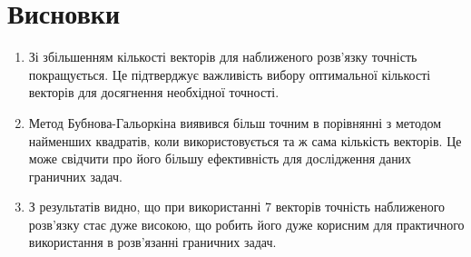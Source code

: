 \chapter{Висновки}

\begin{enumerate}
    \item     Зі збільшенням кількості векторів для наближеного розв'язку точність покращується. Це підтверджує важливість вибору оптимальної кількості векторів для досягнення необхідної точності.

   \item Метод Бубнова-Гальоркіна виявився більш точним в порівнянні з методом найменших квадратів, коли використовується та ж сама кількість векторів. Це може свідчити про його більшу ефективність для дослідження даних граничних задач.

    \item З результатів видно, що при використанні 7 векторів точність наближеного розв'язку стає дуже високою, що робить його дуже корисним для практичного використання в розв'язанні граничних задач.
\end{enumerate}